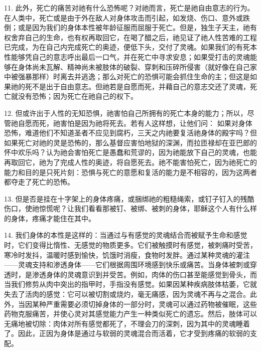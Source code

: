 11. 此外，死亡的痛苦对祂有什么恐怖呢？对祂而言，死亡是祂自由意志的行为。在人类中，死亡或是由于外在敌人对身体攻击而引起，如发烧、伤口、意外或跌倒；或是因为我们的身体本性被年龄征服而屈服于死亡。但是，独生子天主，祂有权舍弃自己的生命，也有权再取回它，在喝了醋之后，祂见证了祂人性苦难的工程已完成，为在自己内完成死亡的奥迹，便低下头，交付了灵魂。如果我们的有死本性能够凭自己的意志呼出最后一口气，并在死亡中寻求安息；如果受打击的灵魂能够在身体尚未瓦解、精神尚未被肢体的破裂、穿刺和压碎所侵害（就好像在自己家中被强暴那样）时离去并逃逸；那么对死亡的恐惧可能会抓住生命的主；但这是如果祂的死不是出于自由意志。但祂若是自愿而死，并藉自己的意志交还了灵魂，死亡就没有恐怖；因为死亡在祂自己的权下。\par

12. 但或许出于人性的无知恐惧，祂害怕自己所拥有的死亡本身的能力；所以，尽管祂自愿而死，祂害怕是因为祂将死去。若有人这样想，让他们问： 如果对身体恐怖，难道他们不知道圣者不应见到腐朽，三天之内祂要复活祂身体的殿宇吗？但如果死亡对祂的灵是恐怖的，那么基督应害怕地狱的深渊，而拉匝禄却在亚巴郎的怀中欢乐吗？认为祂会害怕死亡是愚蠢和荒谬的，因为祂能放下自己的灵魂，也能再取回它，祂为了完成人性的奥迹，将自愿死去。祂不能害怕死亡，因为祂死亡的能力和目的是只死片刻：恐惧与死亡的意愿和复活的能力是不相容的，因为这两者都夺走了死亡的恐怖。\par

13. 但是否是挂在十字架上的身体疼痛，或捆绑祂的粗糙绳索，或钉子钉入的残酷伤口，使祂惊慌呢？让我们看看那被钉、被绑、被刺的身体，耶稣这个人有什么样的身体，疼痛才能住在其中。\par

14. 我们身体的本性是这样的：当通过与有感觉的灵魂结合而被赋予生命和感觉时，它们变得比惰性、无感觉的物质更多。它们被触摸时有感觉，被刺痛时受苦，寒冷时发抖，温暖时感到愉快，饥饿时消瘦，食物时发胖。通过某种灵魂的灌注——灵魂支持和渗透身体——它们根据周围环境感到快乐或痛苦。当身体被刺或穿透时，是渗透身体的灵魂意识到并受苦。例如，肉体的伤口甚至能感觉到骨头，而当我们修剪从肉中突出的指甲时，手指没有感觉。如果因某种疾病肢体枯萎，它就失去了活肉的感觉：它可以被切割或烧灼，毫无痛感，因为灵魂不再与之混合。此外，当因某种严重需要必须切掉身体的一部分时，灵魂可以通过药物被催眠，这些药物克服痛苦，并使心灵对其感觉能力产生一种类似死亡的遗忘。然后，肢体可以无痛地被切除：肉体对所有感觉都死了，不理会刀的深刺，因为其中的灵魂睡着了。因此，正因为身体是通过与软弱的灵魂混合而活着，它才受到疼痛的软弱的支配。\par

